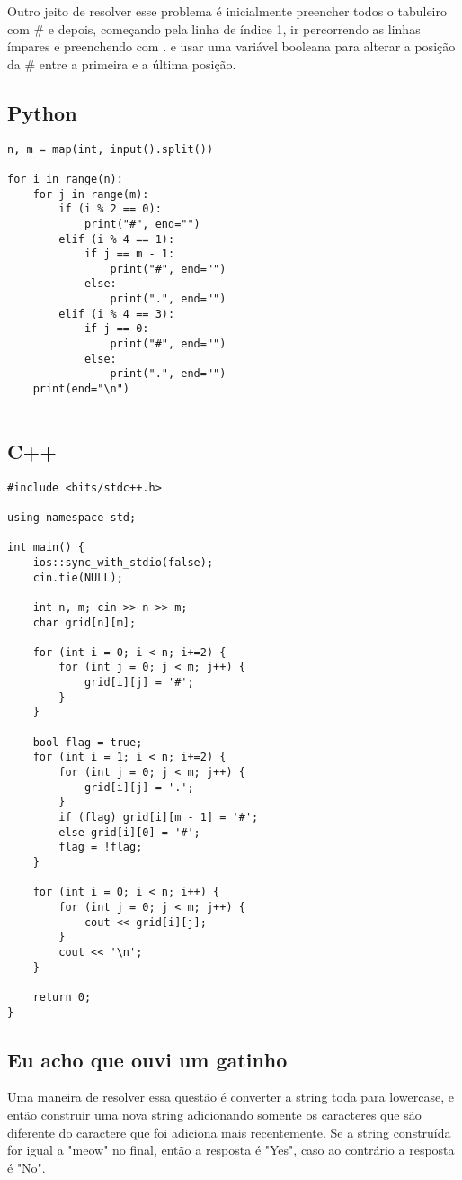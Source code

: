 \documentclass[11pt,fancychapters]{article}
\begin{document}
Outro jeito de resolver esse problema é inicialmente preencher todos o tabuleiro com \# e depois, começando pela linha de índice 1, ir percorrendo as linhas ímpares e preenchendo com . e usar uma variável booleana para alterar a posição da \# entre a primeira e a última posição. \\
\subsection{Python}
\begin{lstlisting}[style=python]
n, m = map(int, input().split())

for i in range(n):
    for j in range(m):
        if (i % 2 == 0):
            print("#", end="")
        elif (i % 4 == 1):
            if j == m - 1:
                print("#", end="")
            else:
                print(".", end="")
        elif (i % 4 == 3):
            if j == 0:
                print("#", end="")
            else:
                print(".", end="")
    print(end="\n")
    
\end{lstlisting}
\newpage
\subsection{C++}
\begin{lstlisting}[style=c++]
#include <bits/stdc++.h>
 
using namespace std;

int main() {
    ios::sync_with_stdio(false);
    cin.tie(NULL);
    
    int n, m; cin >> n >> m;
    char grid[n][m];
    
    for (int i = 0; i < n; i+=2) {
        for (int j = 0; j < m; j++) {
            grid[i][j] = '#';
        }
    }
    
    bool flag = true;
    for (int i = 1; i < n; i+=2) {
        for (int j = 0; j < m; j++) {
            grid[i][j] = '.';
        }
        if (flag) grid[i][m - 1] = '#';
        else grid[i][0] = '#';
        flag = !flag;
    }
    
    for (int i = 0; i < n; i++) {
        for (int j = 0; j < m; j++) {
            cout << grid[i][j];
        }
        cout << '\n';
    }
    
    return 0;
}
\end{lstlisting}
\newpage

\begin{center}\section{Eu acho que ouvi um gatinho}\end{center}
\noindent
Uma maneira de resolver essa questão é converter a string toda para lowercase, e então construir uma nova string adicionando somente os caracteres que são diferente do caractere que foi adiciona mais recentemente. Se a string construída for igual a "meow" no final, então a resposta é "Yes", caso ao contrário a resposta é "No".
\end{document}
